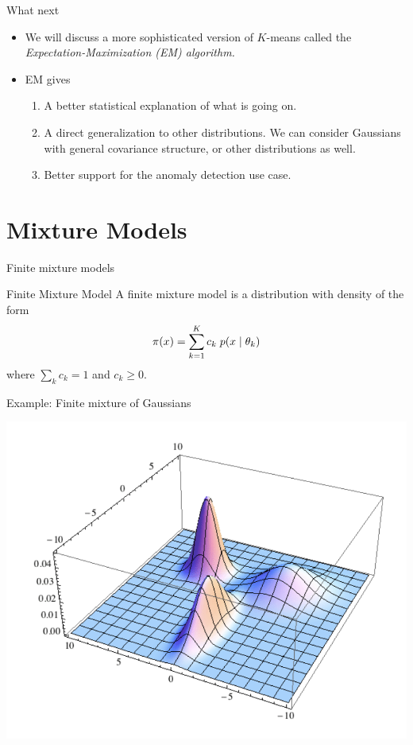 \documentclass[10pt]{beamer}
\begin{document}
\begin{frame}{What next}
\begin{itemize}
\item We will discuss a more sophisticated version of $K$-means called the \it{Expectation-Maximization (EM) algorithm.}

\item EM gives
	\begin{enumerate}
	\item A better statistical explanation of what is going on. 
	\item A direct generalization to other distributions.  We can consider Gaussians with general covariance structure, or other distributions as well.
    \item Better support for the anomaly detection use case.
	\end{enumerate}
\end{itemize}

\end{frame}

\section{Mixture Models} 

\begin{frame}{Finite mixture models}


\begin{sblock}{Finite Mixture Model}
A finite mixture model is a distribution with density of the form
\[ \pi(x) = \displaystyle\sum_{k=1}^K c_k \; p(x \; | \; \theta_k) \]
where $\sum_k c_k =1$ and $c_k \geq 0$.

\end{sblock}
\begin{sblock}{Example: Finite mixture of Gaussians}
\begin{center}
\includegraphics[width=.5\textwidth]{images/gmm}
\end{center}

\end{sblock}

\end{frame}
\end{document}
